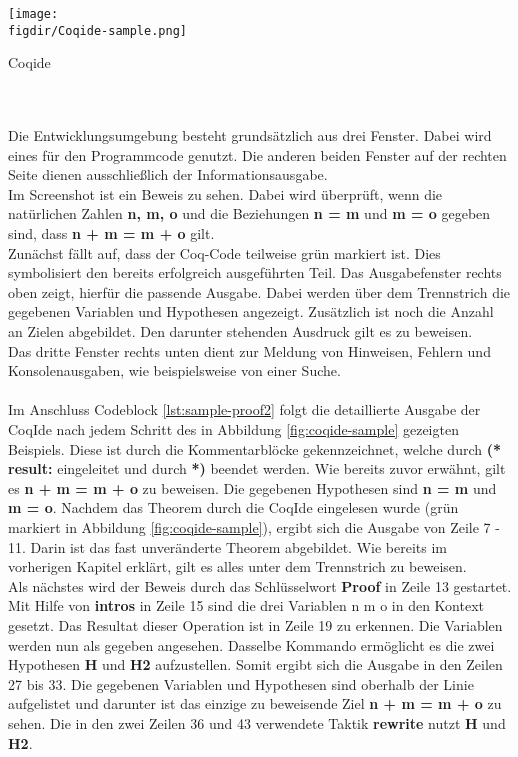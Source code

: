 \begin{minipage}{\textwidth}
	\centering
	\captionsetup{type=figure}
	\texttt{[image: \\figdir/Coqide-sample.png]}
	\caption{Coqide}
	\label{fig:coqide-sample}
\end{minipage}
\\
\\
Die Entwicklungsumgebung besteht grundsätzlich aus drei Fenster. Dabei wird eines für den Programmcode genutzt. Die anderen beiden Fenster auf der rechten Seite dienen ausschließlich der Informationsausgabe.\\
Im Screenshot ist ein Beweis zu sehen. Dabei wird überprüft, wenn die natürlichen Zahlen \textbf{n, m, o} und die Beziehungen \textbf{n = m} und \textbf{m = o} gegeben sind, dass \textbf{n + m = m + o} gilt.\\
Zunächst fällt auf, dass der Coq-Code teilweise grün markiert ist. Dies symbolisiert den bereits erfolgreich ausgeführten Teil. Das Ausgabefenster rechts oben zeigt, hierfür die passende Ausgabe. Dabei werden über dem Trennstrich die gegebenen Variablen und Hypothesen angezeigt. Zusätzlich ist noch die Anzahl an Zielen abgebildet. Den darunter stehenden Ausdruck gilt es zu beweisen.\\
Das dritte Fenster rechts unten dient zur Meldung von Hinweisen, Fehlern und Konsolenausgaben, wie beispielsweise von einer Suche.\\
\\
Im Anschluss  Codeblock \ref{lst:sample-proof2} folgt die detaillierte Ausgabe der CoqIde nach jedem Schritt des in Abbildung \ref{fig:coqide-sample} gezeigten Beispiels.
Diese ist durch die Kommentarblöcke gekennzeichnet, welche durch \textbf{(* result:} eingeleitet und durch \textbf{*)} beendet werden.
Wie bereits zuvor erwähnt, gilt es \textbf{n + m = m + o} zu beweisen. Die gegebenen Hypothesen sind \textbf{n = m} und \textbf{m = o}. Nachdem das Theorem durch die CoqIde eingelesen wurde (grün markiert in Abbildung \ref{fig:coqide-sample}), ergibt sich die Ausgabe von Zeile 7 - 11. Darin ist das fast unveränderte Theorem abgebildet. Wie bereits im vorherigen Kapitel erklärt, gilt es alles unter dem Trennstrich zu beweisen.\\
Als nächstes wird der Beweis durch das Schlüsselwort \textbf{Proof} in Zeile 13 gestartet. Mit Hilfe von \textbf{intros} in Zeile 15 sind die drei Variablen n m o in den Kontext gesetzt. Das Resultat dieser Operation ist in Zeile 19 zu erkennen. Die Variablen werden nun als gegeben angesehen. Dasselbe Kommando ermöglicht es die zwei Hypothesen \textbf{H} und \textbf{H2} aufzustellen. Somit ergibt sich die Ausgabe in den Zeilen 27 bis 33. Die gegebenen Variablen und Hypothesen sind oberhalb der Linie aufgelistet und darunter ist das einzige zu beweisende Ziel \textbf{n + m = m + o} zu sehen. Die in den zwei Zeilen 36 und 43 verwendete Taktik \textbf{rewrite} nutzt \textbf{H} und \textbf{H2}.
